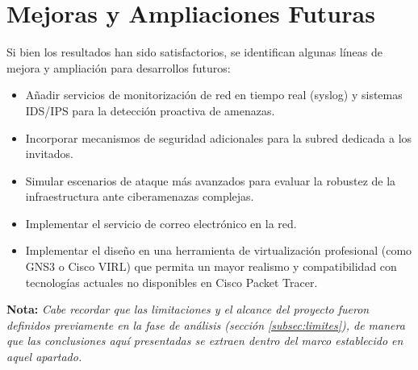 \section{Mejoras y Ampliaciones Futuras}
Si bien los resultados han sido satisfactorios, se identifican algunas líneas de mejora y ampliación para desarrollos futuros:

\begin{itemize}
    \item Añadir servicios de monitorización de red en tiempo real (syslog) y sistemas IDS/IPS para la detección proactiva de amenazas.
    \item Incorporar mecanismos de seguridad adicionales para la subred dedicada a los invitados.
    \item Simular escenarios de ataque más avanzados para evaluar la robustez de la infraestructura ante ciberamenazas complejas.
    \item Implementar el servicio de correo electrónico en la red.
    \item Implementar el diseño en una herramienta de virtualización profesional (como GNS3 o Cisco VIRL) que permita un mayor realismo y 
    compatibilidad con tecnologías actuales no disponibles en Cisco Packet Tracer.
\end{itemize}

\small{\textbf{Nota:}\textit{ Cabe recordar que las limitaciones y el alcance del proyecto fueron definidos previamente en la fase de análisis (sección \ref{subsec:limites}), de manera que las conclusiones aquí presentadas se extraen dentro del marco establecido en aquel apartado.}}
